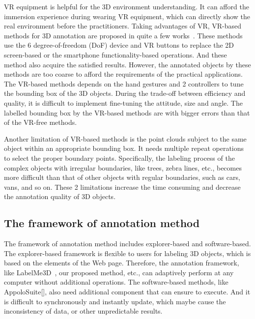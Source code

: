 \documentclass[letterpaper, 10 pt, conference]{ieeeconf}  %
\begin{document}
VR equipment is helpful for the 3D environment understanding. It can afford the immersion experience during wearing VR equipment, which can directly show the real environment before the practitioners. Taking advantages of VR, VR-based methods for 3D annotation are proposed in quite a few works~\cite{pointatme,wilkes20123dVR,coffey2011interactiveVR}. These methods use the 6 degree-of-freedom (DoF) device and VR buttons to replace the 2D screen-based or the smartphone functionality-based operations. And these method also acquire the satisfied results. However, the annotated objects by these methods are too coarse to afford the requirements of the practical applications. The VR-based methods depends on the hand gestures and 2 controllers to tune the bounding box of the 3D objects. During the trade-off between efficiency and quality, it is difficult to implement fine-tuning the attitude, size and angle.  The labelled bounding box by the VR-based methods are with bigger errors than that of the VR-free methods.


Another limitation of VR-based methods is the point clouds subject to the same object within an appropriate bounding box.
It needs multiple repeat operations to select the proper boundary points.
Specifically, the labeling process of the complex objects with irregular boundaries, like trees, zebra lines, etc., becomes more difficult than that of other objects with regular boundaries, such as cars, vans, and so on.
These 2 limitations increase the time consuming and decrease the annotation quality of 3D objects.
\subsection{The framework of annotation method}
The framework of annotation method includes explorer-based and software-based. The explorer-based framework is flexible to users for labeling 3D objects, which is based on the elements of the Web page. Therefore, the annotation framework, like LabelMe3D~\cite{LabelMe3D}, our proposed method, etc., can adaptively perform at any computer without additional operations. The software-based methods, like AppoloSuite[], also need additional component that can ensure to execute. And it is difficult to synchronously and instantly update, which maybe cause the inconsistency of data, or other unpredictable results.
\end{document}
